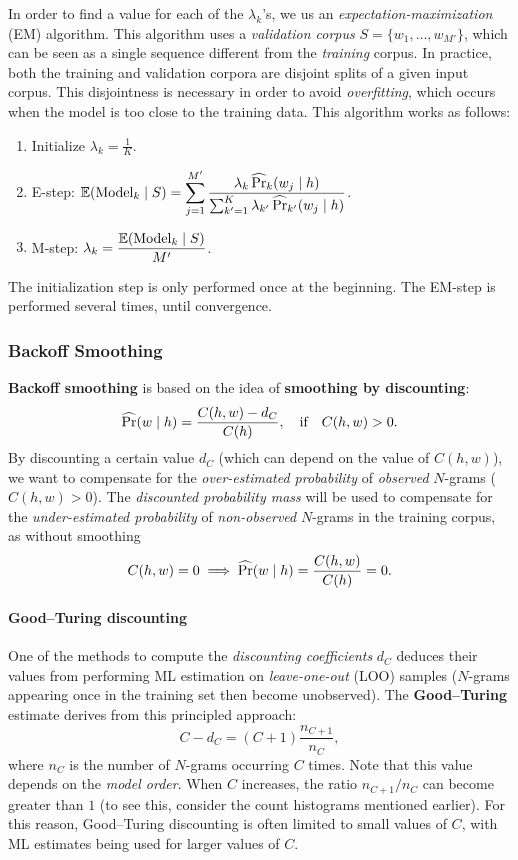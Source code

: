 In order to find a value for each of the \(\lambda_k\)'s, we us an \emph{expectation-maximization} (EM) algorithm.
This algorithm uses a \emph{validation corpus} \(S = \{w_1, \dots, w_{M'}\}\), which can be seen as a single sequence different from the \emph{training} corpus. In practice, both the training and validation corpora are disjoint splits of a given input corpus.
This disjointness is necessary in order to avoid \emph{overfitting}, which occurs when the model is too close to the training data.
This algorithm works as follows:
\begin{enumerate}
	\item Initialize \(\lambda_k = \frac{1}{K}\).
	\item E-step: \(\displaystyle\mathbb{E}(\textnormal{Model}_k \mid S) = \sum_{j = 1}^{M'} \frac{\lambda_k \operatorname{\widehat{\Pr}}_k(w_j \mid h)}{\sum_{k' = 1}^K \lambda_{k'} \operatorname{\widehat{\Pr}}_{k'}(w_j \mid h)}\).
	\item M-step: \(\displaystyle \lambda_k = \frac{\mathbb{E}(\textnormal{Model}_k \mid S)}{M'}\).
\end{enumerate}
The initialization step is only performed once at the beginning.
The EM-step is performed several times, until convergence.

\subsubsection{Backoff Smoothing}
\textbf{Backoff smoothing} is based on the idea of \textbf{smoothing by discounting}:
\[
\operatorname{\widehat{\Pr}}(w \mid h) = \frac{C(h, w) - d_C}{C(h)}, \quad \textnormal{if} \quad C(h, w) > 0.
\]
By discounting a certain value \(d_C\) (which can depend on the value of \(C(h, w)\)), we want to compensate for the \emph{over-estimated probability} of \emph{observed} \(N\)-grams (\(C(h, w) > 0\)).
The \emph{discounted probability mass} will be used to compensate for the \emph{under-estimated probability} of \emph{non-observed} \(N\)-grams in the training corpus, as without smoothing
\[
C(h, w) = 0 \implies \operatorname{\widehat{\Pr}}(w \mid h) = \frac{C(h, w)}{C(h)} = 0.
\]

\paragraph{Good--Turing discounting} One of the methods to compute the \emph{discounting coefficients} \(d_C\) deduces their values from performing ML estimation on \emph{leave-one-out} (LOO) samples (\(N\)-grams appearing once in the training set then become unobserved).
The \textbf{Good--Turing} estimate derives from this principled approach:
\[
C - d_C = (C+1) \frac{n_{C+1}}{n_C},
\]
where \(n_C\) is the number of \(N\)-grams occurring \(C\) times.
Note that this value depends on the \emph{model order}.
When \(C\) increases, the ratio \(n_{C+1}/n_C\) can become greater than \(1\) (to see this, consider the count histograms mentioned earlier).
For this reason, Good--Turing discounting is often limited to small values of \(C\), with ML estimates being used for larger values of \(C\).

